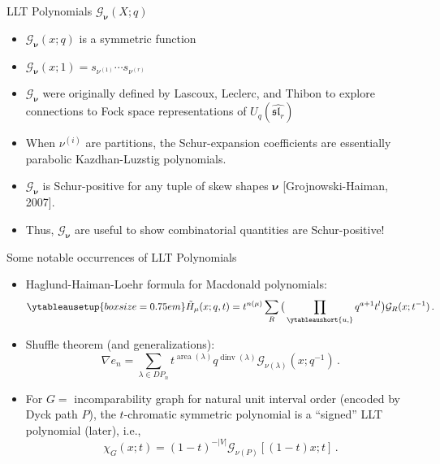 \documentclass[dvipsnames]{beamer}
\newcommand{\xx}{x}%
\newcommand{\Htild}{\tilde{H}}
\newcommand{\Gcal}{{\mathcal G}}
\newcommand{\nubold}{{\boldsymbol \nu }}
\DeclareMathOperator{\dinv}{dinv}
\DeclareMathOperator{\area}{area}
\renewcommand{\sl}{\mathfrak{sl}}
\theoremstyle{definition}
\newcounter{c}
\begin{document}
\begin{frame}{LLT Polynomials \(\Gcal_\nubold(X;q)\)}
  \begin{itemize}
  \item \(\Gcal_\nubold(\xx;q)\) is a symmetric function\pause
  \item \(\Gcal_\nubold(\xx;1) = s_{\nu^{(1)}} \cdots s_{\nu^{(r)}}\)\pause
  \item \(\Gcal_\nubold\) were originally defined by Lascoux, Leclerc, and
    Thibon to explore connections to Fock space representations of \(U_q(\hat{\sl_r})\)\pause
  \item When \(\nu^{(i)}\) are partitions, the Schur-expansion
    coefficients are essentially parabolic Kazdhan-Luzstig polynomials.\pause
  \item \(\Gcal_\nubold\) is Schur-positive for any tuple of skew shapes \(\nubold\)
    [Grojnowski-Haiman, 2007].\pause
  \item Thus, \(\Gcal_\nubold\) are useful to show combinatorial quantities are Schur-positive!
  \end{itemize}
\end{frame}
\begin{frame}{Some notable occurrences of LLT Polynomials}
  \begin{itemize}
  \item Haglund-Haiman-Loehr formula for Macdonald polynomials:
    \[
      \ytableausetup{boxsize=0.75em}
      \Htild_\mu(\xx;q,t) =
      t^{n(\mu)} \sum_R \big( \prod_{\ytableaushort{u,{}}} q^{a+1}
        t^l\big) \Gcal_R(\xx;t^{-1})\,.
    \]\pause
  \item Shuffle theorem (and generalizations):
    \[
      \nabla e_n =
      \sum_{\lambda \in DP_n} t^{\area(\lambda)} q^{\dinv(\lambda)}
      \Gcal_{\nu(\lambda)}(\xx;q^{-1})\,.
    \]\pause
  \item For \(G = \) incomparability graph for natural unit interval
    order (encoded by Dyck path \(P\)), the \(t\)-chromatic symmetric
    polynomial is a ``signed'' LLT polynomial (later), i.e.,
    \[
      \chi_G(x;t) = {(1-t)}^{-|V|} \Gcal_{\nu(P)}[(1-t)x;t] \,.
    \]
  \end{itemize}
\end{frame}
\end{document}
